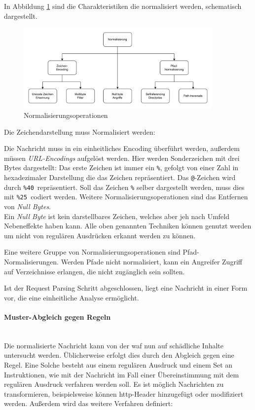 In Abbildung \ref{fig:norming} sind die Charakteristiken die normalisiert werden, schematisch dargestellt.

\begin{figure}[!hbt]
    \centering
    \includegraphics[width=0.9\textwidth]{./images/Normalisierung.png}
    \caption{Normalisierungsoperationen}
    \label{fig:norming}
\end{figure}

Die Zeichendarstellung muss Normalisiert werden:

Die Nachricht muss in ein einheitliches Encoding überführt werden, außerdem müssen \textit{URL-Encodings} aufgelöst werden.
Hier werden Sonderzeichen mit drei Bytes dargestellt:
Das erste Zeichen ist immer ein \glqq\verb|%|\grqq , gefolgt von einer Zahl in hexadezimaler Darstellung die das Zeichen repräsentiert.
Das \verb|@|-Zeichen wird durch \glqq\verb|%40|\grqq\ repräsentiert.
Soll das Zeichen \verb|%| selber dargestellt werden, muss dies mit \glqq\verb|%25|\grqq\ codiert werden.
Weitere Normalisierungsoperationen sind das Entfernen von \textit{Null Bytes}.\\

Ein \textit{Null Byte} ist kein darstellbares Zeichen, welches aber jeh nach Umfeld Nebeneffekte haben kann.
Alle oben genannten Techniken können genutzt werden um nicht von regulären Ausdrücken erkannt werden zu können.

Eine weitere Gruppe von Normalisierungsoperationen sind Pfad-Normalisierungen.
Werden Pfade nicht normalisiert, kann ein Angreifer Zugriff auf Verzeichnisse erlangen, die nicht zugänglich sein sollten.

Ist der Request Parsing Schritt abgeschlossen, liegt eine Nachricht in einer Form vor, die eine einheitliche Analyse ermöglicht.

\paragraph{Muster-Abgleich gegen Regeln}\ \\
Die normalisierte Nachricht kann von der \ac{waf} nun auf schädliche Inhalte untersucht werden.
Üblicherweise erfolgt dies durch den Abgleich gegen eine Regel.
Eine Solche besteht aus einem regulären Ausdruck und einem Set an Instruktionen, wie mit der Nachricht im Fall einer Übereinstimmung mit dem regulären Ausdruck verfahren werden soll.
Es ist möglich Nachrichten zu transformieren, beispielsweise können \ac{http}-Header hinzugefügt oder modifiziert werden.
Außerdem wird das weitere Verfahren definiert:

